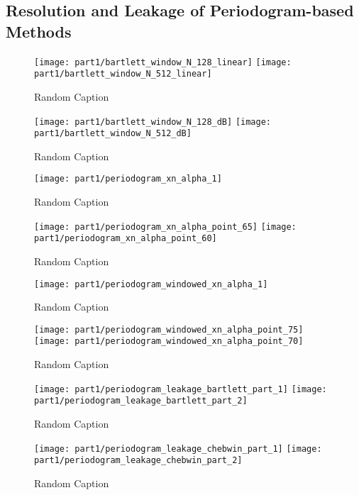 \subsection{Resolution and Leakage of Periodogram-based Methods}


\begin{figure}[H]
\centering{}
\texttt{[image: part1/bartlett\_window\_N\_128\_linear]}
\texttt{[image: part1/bartlett\_window\_N\_512\_linear]}
\caption{Random Caption}
\end{figure}

\begin{figure}[H]
\centering{}
\texttt{[image: part1/bartlett\_window\_N\_128\_dB]}
\texttt{[image: part1/bartlett\_window\_N\_512\_dB]}
\caption{Random Caption}
\end{figure}

\begin{figure}[H]
\centering{}
\texttt{[image: part1/periodogram\_xn\_alpha\_1]}
\caption{Random Caption}
\end{figure}

\begin{figure}[H]
\centering{}
\texttt{[image: part1/periodogram\_xn\_alpha\_point\_65]}
\texttt{[image: part1/periodogram\_xn\_alpha\_point\_60]}
\caption{Random Caption}
\end{figure}

\begin{figure}[H]
\centering{}
\texttt{[image: part1/periodogram\_windowed\_xn\_alpha\_1]}
\caption{Random Caption}
\end{figure}

\begin{figure}[H]
\centering{}
\texttt{[image: part1/periodogram\_windowed\_xn\_alpha\_point\_75]}
\texttt{[image: part1/periodogram\_windowed\_xn\_alpha\_point\_70]}
\caption{Random Caption}
\end{figure}

\begin{figure}[H]
\centering{}
\texttt{[image: part1/periodogram\_leakage\_bartlett\_part\_1]}
\texttt{[image: part1/periodogram\_leakage\_bartlett\_part\_2]}
\caption{Random Caption}
\end{figure}

\begin{figure}[H]
\centering{}
\texttt{[image: part1/periodogram\_leakage\_chebwin\_part\_1]}
\texttt{[image: part1/periodogram\_leakage\_chebwin\_part\_2]}
\caption{Random Caption}
\end{figure}



